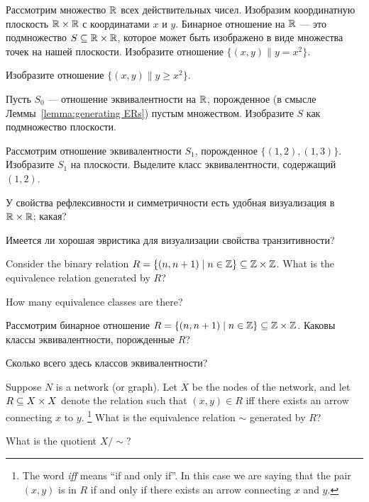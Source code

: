\documentclass[CT4S-EN-RU]{subfiles}
\begin{document}
\begin{exerciseRUS}
Рассмотрим множество $\RR$ всех действительных чисел. Изобразим координатную плоскость $\RR\times\RR$ с координатами $x$ и $y$. Бинарное отношение на $\RR$ — это подмножество $S\ss\RR\times\RR$, которое может быть изображено в виде множества точек на нашей плоскости. 
\sexc Изобразите отношение $\{(x,y)\|y=x^2\}$. 
\item Изобразите отношение $\{(x,y)\|y\geq x^2\}.$
\item Пусть $S_0$ — отношение эквивалентности на $\RR$, порожденное (в смысле Леммы~\ref{lemma:generating ERs}) пустым множеством. Изобразите $S$ как подмножество плоскости.
\item Рассмотрим отношение эквивалентности $S_1$, порожденное $\{(1,2),(1,3)\}$. Изобразите $S_1$ на плоскости. Выделите класс эквивалентности, содержащий $(1,2)$.
\item У свойства рефлексивности и симметричности есть удобная визуализация в $\RR\times\RR$; какая? 
\item Имеется ли хорошая эвристика для визуализации свойства транзитивности?
\endsexc
\end{exerciseRUS}

\begin{exerciseENG}
Consider the binary relation $R=\{(n,n+1)\|n\in\ZZ\}\ss\ZZ\times\ZZ$. 
\sexc What is the equivalence relation generated by $R$? 
\item How many equivalence classes are there?
\endsexc
\end{exerciseENG}

\begin{exerciseRUS}
Рассмотрим бинарное отношение $R=\{(n,n+1)\|n\in\ZZ\}\ss\ZZ\times\ZZ$. 
\sexc Каковы классы эквивалентности, порожденные $R$? 
\item Сколько всего здесь классов эквивалентности?
\endsexc
\end{exerciseRUS}

\begin{exerciseENG}
Suppose $N$ is a network (or graph). Let $X$ be the nodes of the network, and let $R\ss X\times X$ denote the relation such that $(x,y)\in R$ iff there exists an arrow connecting $x$ to $y$.%
\footnote{The word {\em iff} means “if and only if”. In this case we are saying that the pair $(x,y)$ is in $R$ if and only if there exists an arrow connecting $x$ and $y$.}
\sexc What is the equivalence relation $\sim$ generated by $R$? 
\item What is the quotient $X/\sim$?
\endsexc
\end{exerciseENG}
\end{document}
